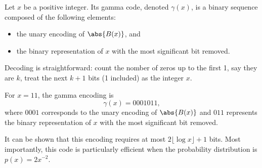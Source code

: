 \documentclass{subfiles}
\begin{document}
    Let \(x\) be a positive integer. Its gamma code, denoted 
    \(\gamma(x)\), is a binary sequence composed of the following elements:
    \begin{itemize}
        \item the unary encoding of \(\abs{B(x)}\), and
        \item the binary representation of \(x\) with the most significant bit removed.
    \end{itemize}
    Decoding is straightforward: count the nomber of zeros up to the first 1, 
        say they are \(k\), treat the next \(k + 1\) bits (1 included) as the integer \(x\).

    \begin{example*}
        For \(x = 11\), the gamma encoding is
        \[
            \gamma(x) = 0001011,
        \]
        where \(0001\) corresponds to the unary encoding of \(\abs{B(x)}\) 
        and \(011\) represents the binary representation of \(x\) with the 
        most significant bit removed.
    \end{example*}

    It can be shown that this 
    encoding requires at most \(2 \lfloor \log x \rfloor + 1\) bits. Most 
    importantly, this code is particularly efficient when the probability 
    distribution is \(p(x) = 2 x^{-2}\).
\end{document}
